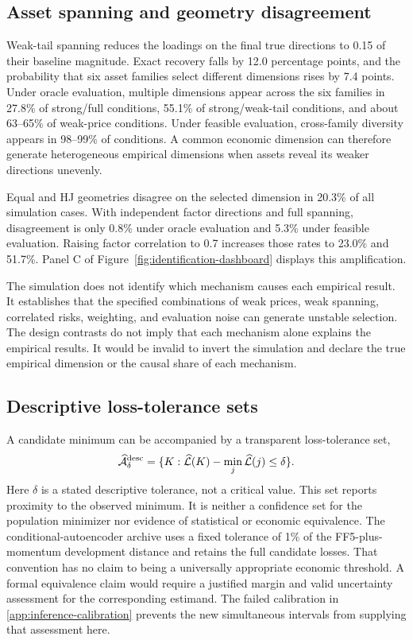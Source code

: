 \subsection{Asset spanning and geometry disagreement}

Weak-tail spanning reduces the loadings on the final true directions to 0.15 of their baseline magnitude. Exact recovery falls by 12.0 percentage points, and the probability that six asset families select different dimensions rises by 7.4 points. Under oracle evaluation, multiple dimensions appear across the six families in 27.8\% of strong/full conditions, 55.1\% of strong/weak-tail conditions, and about 63--65\% of weak-price conditions. Under feasible evaluation, cross-family diversity appears in 98--99\% of conditions. A common economic dimension can therefore generate heterogeneous empirical dimensions when assets reveal its weaker directions unevenly.

Equal and HJ geometries disagree on the selected dimension in 20.3\% of all simulation cases. With independent factor directions and full spanning, disagreement is only 0.8\% under oracle evaluation and 5.3\% under feasible evaluation. Raising factor correlation to 0.7 increases those rates to 23.0\% and 51.7\%. Panel C of Figure~\ref{fig:identification-dashboard} displays this amplification.

The simulation does not identify which mechanism causes each empirical result. It establishes that the specified combinations of weak prices, weak spanning, correlated risks, weighting, and evaluation noise can generate unstable selection. The design contrasts do not imply that each mechanism alone explains the empirical results. It would be invalid to invert the simulation and declare the true empirical dimension or the causal share of each mechanism.

\subsection{Descriptive loss-tolerance sets}

A candidate minimum can be accompanied by a transparent loss-tolerance set,
\begin{equation}
 \widehat{\mathcal A}_{\delta}^{\mathrm{desc}}=
 \{K:\widehat{\mathcal{L}}(K)-\min_j\widehat{\mathcal{L}}(j)\leq\delta\}.
\end{equation}
Here $\delta$ is a stated descriptive tolerance, not a critical value. This set
reports proximity to the observed minimum. It is neither a confidence set for
the population minimizer nor evidence of statistical or economic equivalence.
The conditional-autoencoder archive uses a fixed tolerance of 1\% of the
FF5-plus-momentum development distance and retains the full candidate losses.
That convention has no claim to being a universally appropriate economic
threshold. A formal equivalence claim would require a justified margin and
valid uncertainty assessment for the corresponding estimand. The failed
calibration in \ref{app:inference-calibration} prevents the new
simultaneous intervals from supplying that assessment here.
